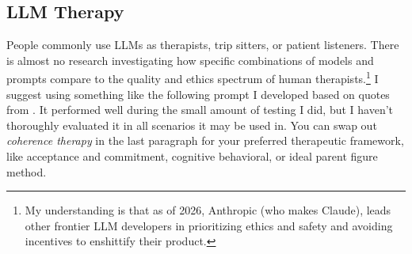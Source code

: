 \documentclass[11pt,oneside]{book}
\begin{document}
\subsection*{LLM Therapy}
People commonly use LLMs as therapists, trip sitters, or patient listeners. There is almost no research investigating how specific combinations of models and prompts compare to the quality and ethics spectrum of human therapists.\footnote{My understanding is that as of 2026, Anthropic (who makes Claude), leads other frontier LLM developers in prioritizing ethics and safety and avoiding incentives to enshittify their product.} I suggest using something like the following prompt I developed based on quotes from \textcites{BRWAIdownload}[p. 46]{eckerUnlocking}. It performed well during the small amount of testing I did, but I haven't thoroughly evaluated it in all scenarios it may be used in. You can swap out \textit{coherence therapy} in the last paragraph for your preferred therapeutic framework, like acceptance and commitment, cognitive behavioral, or ideal parent figure method.
\end{document}
